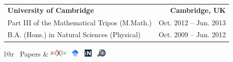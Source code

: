 \documentclass[letterpaper,11pt]{article}
\newcommand{\arxivlogo}{\includegraphics[height=1em]{figures/arxiv-logo.pdf}}
\newcommand{\inspirelogo}{\includegraphics[height=1em]{figures/inspire-logo.pdf}}
\newcommand{\adslogo}{\includegraphics[height=1em]{figures/ads-logo.pdf}}
\newcommand{\scholarlogo}{\includegraphics[height=1em]{figures/gscholar-logo.pdf}}
\begin{document}
\vspace{2mm}

\noindent
\begin{tabular*}{\textwidth}{l@{\extracolsep{\fill}}r}
\textbf{University of Cambridge}  & \textbf {Cambridge, UK}\vspace{0mm}\\
{Part III of the Mathematical Tripos (M.Math.)} & {Oct. 2012 -- Jun. 2013}\vspace{0.0mm}\\ 
{B.A. (Hons.) in Natural Sciences (Physical)} & {Oct. 2009 -- Jun. 2012} \\
\end{tabular*}


\vspace{3mm}

\noindent
\begin{tabular*}{\textwidth}{l@{\extracolsep{\fill}}r}
\large {\sc \Large{\faBook~Papers}} & 
\href{https://arxiv.org/a/mishrasharma_s_1.html}{\arxivlogo}  \
\href{https://scholar.google.com/citations?hl=en&user=hJVjhlwAAAAJ&view_op=list_works&sortby=pubdate}{\scholarlogo}  \ 
\href{https://inspirehep.net/authors/1394493}{\inspirelogo}  \ 
\href{https://ui.adsabs.harvard.edu/search/p_=0&q=author%3A%22Mishra-Sharma%2C%20Siddharth%22&sort=date%20desc%2C%20bibcode%20desc}{\adslogo} \\
\hline
\end{tabular*}\vspace{3mm}

%
%
%
%
\end{document}
